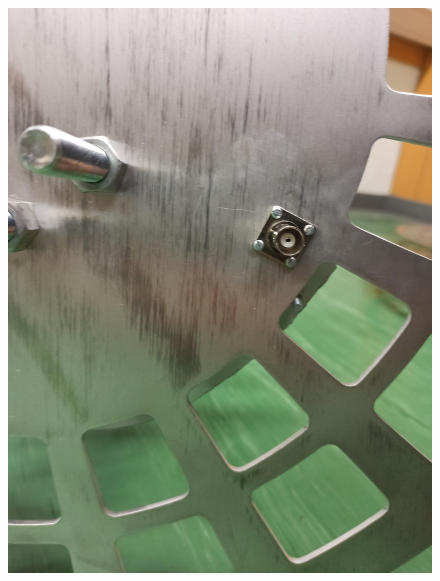 \begin{figure}[H]
	\begin{minipage}[b]{.4\linewidth} %
		\includegraphics[width=\linewidth]{../ref/BNC-Buchse.jpg}
		\label{fig:BNC-Buchse}
	\end{minipage}
	\hspace{.1\linewidth}%
	\begin{minipage}[b]{.4\linewidth} %

\end{minipage}
\end{figure}
